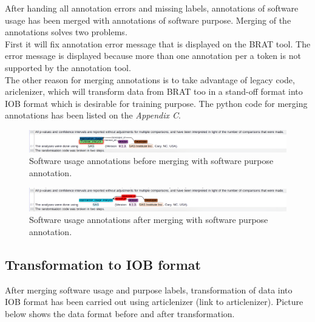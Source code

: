 After handing all annotation errors and missing labels, annotations of software usage has been merged with annotations of software purpose. Merging of the annotations solves two problems. \\

First it will fix annotation error message that is displayed on the BRAT tool. The error message is displayed because more than one annotation per a token is not supported by the annotation tool. \\

The other reason for merging annotations is to take advantage of legacy code, ariclenizer, which will transform data from BRAT too in a stand-off format  into IOB format which is desirable for training purpose. The python code for merging annotations has been listed on the \emph{Appendix C}.

\begin{figure}[htbp]
	\centering
	\includegraphics[width=.95\textwidth]{4.graphics/figures/ch_4/2002515_plm_unm_HD}
	\caption{Software usage annotations before merging with software purpose  annotation.}
	
	\label{fig:chapter04:setup}
\end{figure}

\begin{figure}[htbp]
	\centering
	\includegraphics[width=.95\textwidth]{4.graphics/figures/ch_4/2002515_plm_HD}
	\caption{Software usage annotations after merging with software purpose  annotation.}
	\label{fig:chapter04:setup}
\end{figure}


\subsection{Transformation to IOB format}
\label{subsec:dataset:preprocessing:Transformation}
After merging software usage and purpose labels, transformation of data into IOB format has been carried out using articlenizer (link to articlenizer). Picture below shows the data format before and after transformation. \\

